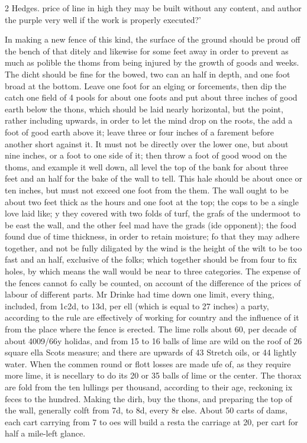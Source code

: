 \documentclass[10pt]{article}
\begin{document}
\begin{multicols}{2}\raggedcolumns
Hedges. price of line in high they may be built without any content, and author the purple very well if the work is properly executed?’

In making a new fence of this kind, the surface of the ground should be proud off the bench of that ditely and likewise for some feet away in order to prevent as much as polible the thoms from being injured by the growth of goods and weeks. The dicht should be fine for the bowed, two can an half in depth, and one foot broad at the bottom. Leave one foot for an elging or forcements, then dip the catch one field of 4 pools for about one foots and put about three inches of good earth below the thons, which should be laid nearly horizontal, but the point, rather including upwards, in order to let the mind drop on the roots, the add a foot of good earth above it; leave three or four inches of a farement before another short against it. It must not be directly over the lower one, but about nine inches, or a foot to one side of it; then throw a foot of good wood on the thoms, and example it well down, all level the top of the bank for about three feet and an half for the bake of the wall to tell. This hale should be about once or ten inches, but must not exceed one foot from the them. The wall ought to be about two feet thick as the hours and one foot at the top; the cops to be a single love laid like; y they covered with two folds of turf, the grafs of the undermoot to be east the wall, and the other feel mad have the grads (ide opponent); the food found due of time thickness, in order to retain moisture; fo that they may adhere together, and not be fully diligated by the wind is the height of the wilt to be too fast and an half, exclusive of the folks; which together should be from four to fix holes, by which means the wall would be near to three categories. The expense of the fences cannot fo cally be counted, on account of the difference of the prices of labour of different parts. Mr Drinke had time down one limit, every thing, included, from 1c2d, to 13d, per ell (which is equal to 27 inches) a party, according to the rule are effectively of working for country and the influence of it from the place where the fence is erected. The lime rolls about 60, per decade of about 4009/66y holidas, and from 15 to 16 balls of lime are wild on the roof of 26 square ella Scots measure; and there are upwards of 43 Stretch oils, or 44 lightly water. When the commen round or flott losses are made ufe of, as they require more lime, it is necellary to do its 20 or 35 balls of lime or the center. The thorax are fold from the ten lullings per thousand, according to their age, reckoning ix feces to the hundred. Making the dirh, buy the thons, and preparing the top of the wall, generally colft from 7d, to 8d, every 8r else. About 50 carts of dams, each cart carrying from 7 to oes will build a resta the carriage at 20, per cart for half a mile-left glance.


\end{multicols}
\end{document}
